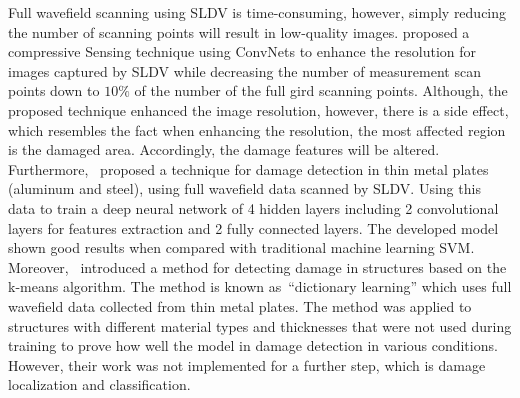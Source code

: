Full wavefield scanning using SLDV is time-consuming, however, simply reducing the number of scanning points will result in low-quality images. 
\textcite{esfandabadideep} proposed a compressive Sensing technique using ConvNets to enhance the resolution for images captured by SLDV while decreasing the number of measurement scan points down to \(10\%\) of the number of the full gird scanning points. 
Although, the proposed technique enhanced the image resolution, however, there is a side effect, which resembles the fact when enhancing the resolution, the most affected region is the damaged area. 
Accordingly, the damage features will be altered.
Furthermore,~\textcite{Melville2018} proposed a technique for damage detection in thin metal plates (aluminum and steel), using full wavefield data scanned by SLDV. 
Using this data to train a deep neural network of 4 hidden layers including 2 convolutional layers for features extraction and 2 fully connected layers. 
The developed model shown good results when compared with traditional machine learning SVM.
Moreover,~\textcite{Melville2017} introduced a method for detecting damage in structures based on the k-means algorithm. 
The method is known as~\enquote{dictionary learning} which uses full wavefield data collected from thin metal plates. 
The method was applied to structures with different material types and thicknesses that were not used during training to prove how well the model in damage detection in various conditions. 
However, their work was not implemented for a further step, which is damage localization and classification.
